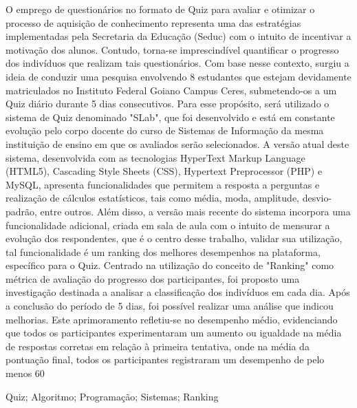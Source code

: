 \documentclass{modelo_resumo_simples}
\begin{document}
	
	\construirtitulo

	\construirautores
	
	\begin{resumo}
	O emprego de questionários no formato de Quiz para avaliar e otimizar o processo de aquisição de conhecimento representa uma das estratégias implementadas pela Secretaria da Educação (Seduc) com o intuito de incentivar a motivação dos alunos. Contudo, torna-se imprescindível quantificar o progresso dos indivíduos que realizam tais questionários. Com base nesse contexto, surgiu a ideia de conduzir uma pesquisa envolvendo 8 estudantes que estejam devidamente matriculados no Instituto Federal Goiano Campus Ceres, submetendo-os a um Quiz diário durante 5 dias consecutivos. Para esse propósito, será utilizado o sistema de Quiz denominado "SLab", que foi desenvolvido e está em constante evolução pelo corpo docente do curso de Sistemas de Informação da mesma instituição de ensino em que os avaliados serão selecionados. A versão atual deste sistema, desenvolvida com as tecnologias HyperText Markup Language (HTML5), Cascading Style Sheets (CSS), Hypertext Preprocessor (PHP) e MySQL, apresenta funcionalidades que permitem a resposta a perguntas e realização de cálculos estatísticos, tais como média, moda, amplitude, desvio-padrão, entre outros. Além disso, a versão mais recente do sistema incorpora uma funcionalidade adicional, criada em sala de aula com o intuito de mensurar a evolução dos respondentes, que é o centro desse trabalho, validar sua utilização, tal funcionalidade é um ranking dos melhores desempenhos na plataforma, específico para o Quiz. Centrado na utilização do conceito de "Ranking" como métrica de avaliação do progresso dos participantes, foi proposto uma investigação destinada a analisar a classificação dos indivíduos em cada dia. Após a conclusão do período de 5 dias, foi possível realizar uma análise que indicou melhorias. Este aprimoramento refletiu-se no desempenho médio, evidenciando que todos os participantes experimentaram um aumento ou igualdade na média de respostas corretas em relação à primeira tentativa, onde na média da pontuação final, todos os participantes registraram um desempenho de pelo menos 60%
	\end{resumo}
	
	\begin{palavras_chave}
	Quiz; Algoritmo; Programação; Sistemas; Ranking
	\end{palavras_chave}
\end{document}
